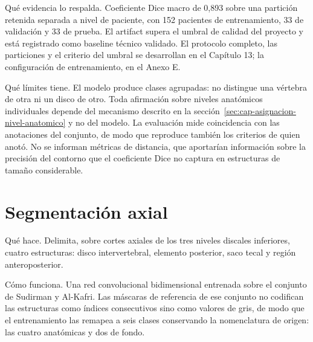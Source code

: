 Qué evidencia lo respalda. Coeficiente Dice macro de 0,893 sobre una partición retenida separada a nivel de paciente, con 152 pacientes de entrenamiento, 33 de validación y 33 de prueba. El artifact supera el umbral de calidad del proyecto y está registrado como baseline técnico validado. El protocolo completo, las particiones y el criterio del umbral se desarrollan en el Capítulo 13; la configuración de entrenamiento, en el Anexo E.

Qué límites tiene. El modelo produce clases agrupadas: no distingue una vértebra de otra ni un disco de otro. Toda afirmación sobre niveles anatómicos individuales depende del mecanismo descrito en la sección~\ref{sec:cap-asignacion-nivel-anatomico} y no del modelo. La evaluación mide coincidencia con las anotaciones del conjunto, de modo que reproduce también los criterios de quien anotó. No se informan métricas de distancia, que aportarían información sobre la precisión del contorno que el coeficiente Dice no captura en estructuras de tamaño considerable.

\section{Segmentación axial}

Qué hace. Delimita, sobre cortes axiales de los tres niveles discales inferiores, cuatro estructuras: disco intervertebral, elemento posterior, saco tecal y región anteroposterior.

Cómo funciona. Una red convolucional bidimensional entrenada sobre el conjunto de Sudirman y Al-Kafri. Las máscaras de referencia de ese conjunto no codifican las estructuras como índices consecutivos sino como valores de gris, de modo que el entrenamiento las remapea a seis clases conservando la nomenclatura de origen: las cuatro anatómicas y dos de fondo.

